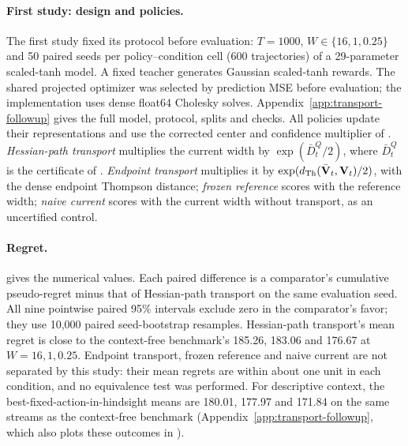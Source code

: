 \paragraph{First study: design and policies.}
The first study fixed its protocol before evaluation: $T=1000$,
$W\in\{16,1,0.25\}$ and 50 paired seeds per policy--condition cell (600
trajectories) of a 29-parameter scaled-tanh model. A fixed teacher generates
Gaussian scaled-tanh rewards. The shared projected optimizer was selected by
prediction MSE before evaluation; the implementation uses dense float64
Cholesky solves. Appendix~\ref{app:transport-followup} gives the full model,
protocol, splits and checks.
All policies update their representations and use the corrected center and
confidence multiplier of .
\emph{Hessian-path transport} multiplies the current width by
$\exp(\bar D_t^Q/2)$, where $\bar D_t^Q$ is the certificate of
. \emph{Endpoint transport} multiplies it by
$\exp(d_{\rm Th}(\bar{\mathbf{V}}_t,\mathbf{V}_t)/2)$, with the dense endpoint Thompson distance;
\emph{frozen reference} scores with the reference width; \emph{naive current} scores with the current width without transport,
as an uncertified control.

\paragraph{Regret.}
 gives the numerical values. Each paired
difference is a comparator's cumulative pseudo-regret minus that of
Hessian-path transport on the same evaluation seed. All nine pointwise paired
95\% intervals exclude zero in the comparator's favor; they use 10,000 paired
seed-bootstrap resamples. Hessian-path transport's mean regret is close to the
context-free benchmark's 185.26, 183.06 and 176.67 at $W=16,1,0.25$. Endpoint
transport, frozen reference and naive current are not separated by this study:
their mean regrets are within about one unit in each condition, and no
equivalence test was performed. For descriptive context, the
best-fixed-action-in-hindsight means are 180.01, 177.97 and 171.84 on the same
streams as the context-free benchmark (Appendix~\ref{app:transport-followup},
which also plots these outcomes in ).

\begin{table}[H]
\centering
\caption{First study: mean regret at $T=1000$ and
comparator-minus-Hessian-path paired differences. Intervals are pointwise
95\% paired seed-bootstrap intervals from 10,000 resamples of 50 seeds per
condition.}
\label{tab:transport-followup-outcomes}

\end{table}

